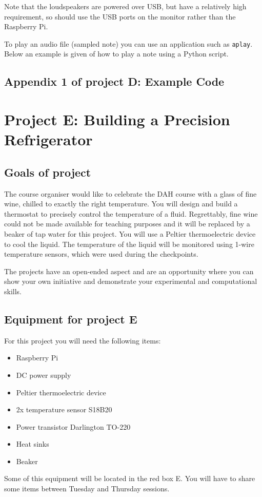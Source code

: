 Note that the loudspeakers are powered over USB, but have a relatively high requirement, so should use the USB ports on the monitor rather than the Raspberry Pi.

To play an audio file (sampled note) you can use an application such as \texttt{aplay}. Below an example is given of how to play a note using a Python script.

\vspace*{-0.5cm}

\newpage



\subsection*{Appendix 1 of project D: Example Code}




\newpage
\section{Project E: Building a Precision Refrigerator}

\subsection{Goals of project}

The course organiser would like to celebrate the DAH course with a glass of fine wine, chilled to exactly the right temperature.
You will design and build a thermostat to precisely control the temperature of a fluid.
Regrettably, fine wine could not be made available for teaching purposes and it will be replaced by a beaker of tap water for this project.
You will use a Peltier thermoelectric device to cool the liquid.
The temperature of the liquid will be monitored using 1-wire temperature sensors, which were used during the checkpoints.

The projects have an open-ended aspect and are an opportunity where you can show your own initiative and demonstrate your experimental and computational skills. 

\subsection{Equipment for project E}

For this project you will need the following items:
\begin{itemize}
\item Raspberry Pi
\item DC power supply
\item Peltier thermoelectric device
\item 2x temperature sensor S18B20
\item Power transistor Darlington TO-220
\item Heat sinks
\item Beaker
\end{itemize}
Some of this equipment will be located in the red box E.
You will have to share some items between Tuesday and Thursday sessions. 



